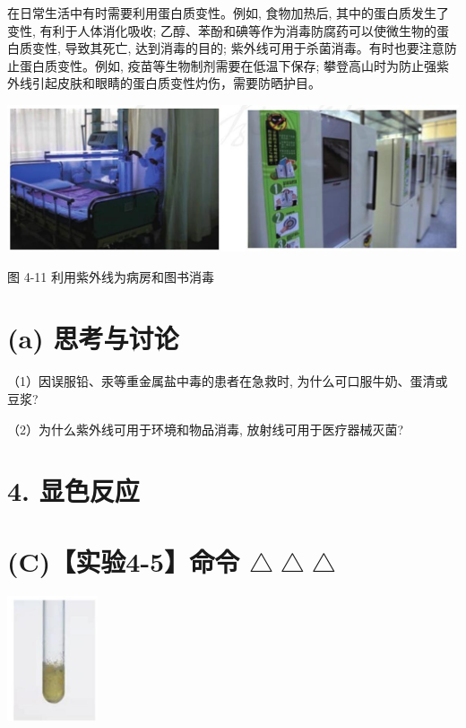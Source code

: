 \documentclass[10pt]{article}
\begin{document}
在日常生活中有时需要利用蛋白质变性。例如, 食物加热后, 其中的蛋白质发生了变性, 有利于人体消化吸收; 乙醇、苯酚和碘等作为消毒防腐药可以使微生物的蛋白质变性, 导致其死亡, 达到消毒的目的; 紫外线可用于杀菌消毒。有时也要注意防止蛋白质变性。例如, 疫苗等生物制剂需要在低温下保存; 攀登高山时为防止强紫外线引起皮肤和眼睛的蛋白质变性灼伤，需要防晒护目。

\begin{center}
\includegraphics[max width=1.0\textwidth]{images/0190efc5-b58a-7c43-bfb0-e0a030df9cfd_121_939922.jpg}
\end{center}

图 4-11 利用紫外线为病房和图书消毒

\section*{(a) 思考与讨论}

（1）因误服铅、汞等重金属盐中毒的患者在急救时, 为什么可口服牛奶、蛋清或豆浆?

（2）为什么紫外线可用于环境和物品消毒, 放射线可用于医疗器械灭菌?

\section*{4. 显色反应}

\section*{(C)【实验4-5】命令 \(\bigtriangleup \bigtriangleup \bigtriangleup\)}

\begin{center}
\includegraphics[max width=0.2\textwidth]{images/0190efc5-b58a-7c43-bfb0-e0a030df9cfd_122_430682.jpg}
\end{center}
\end{document}
